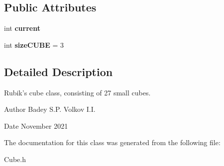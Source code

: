\subsection*{Public Attributes}
\begin{DoxyCompactItemize}
\item 
\hypertarget{class_cube_ae004d5b59b21765effdc43e2f8cc84e1}{int {\bfseries current}}\label{class_cube_ae004d5b59b21765effdc43e2f8cc84e1}

\item 
\hypertarget{class_cube_a6502cfa2bce7106c1c6bc9c64ecef7fb}{int {\bfseries size\-C\-U\-B\-E} = 3}\label{class_cube_a6502cfa2bce7106c1c6bc9c64ecef7fb}

\end{DoxyCompactItemize}


\subsection{Detailed Description}
Rubik's cube class, consisting of 27 small cubes. 

\begin{DoxyAuthor}{Author}
Badey S.\-P. Volkov I.\-I. 
\end{DoxyAuthor}
\begin{DoxyDate}{Date}
November 2021 
\end{DoxyDate}


The documentation for this class was generated from the following file\-:\begin{DoxyCompactItemize}
\item 
Cube.\-h\end{DoxyCompactItemize}
